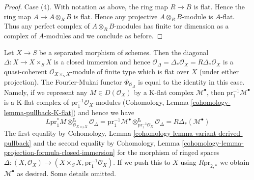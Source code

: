 \begin{proof}
\medskip\noindent
Case (4). With notation as above, the ring map $R \to B$ is flat.
Hence the ring map $A \to A \otimes_R B$ is flat. Hence any projective
$A \otimes_R B$-module is $A$-flat. Thus any perfect complex of
$A \otimes_R B$-modules has finite tor dimension as a complex
of $A$-modules and we conclude as before.
\end{proof}

\begin{example}
\label{example-diagonal-fourier-mukai}
Let $X \to S$ be a separated morphism of schemes. Then the diagonal
$\Delta : X \to X \times_S X$ is a closed immersion and hence
$\mathcal{O}_\Delta = \Delta_*\mathcal{O}_X = R\Delta_*\mathcal{O}_X$
is a quasi-coherent $\mathcal{O}_{X \times_S X}$-module of finite type
which is flat over $X$ (under either projection). The Fourier-Mukai functor
$\Phi_{\mathcal{O}_\Delta}$ is equal to the identity in this case.
Namely, if we represent any $M \in D(\mathcal{O}_X)$ by a K-flat
complex $\mathcal{M}^\bullet$, then $\text{pr}_1^{-1}\mathcal{M}^\bullet$
is a K-flat complex of $\text{pr}_1^{-1}\mathcal{O}_X$-modules
(Cohomology, Lemma \ref{cohomology-lemma-pullback-K-flat})
and hence we have
$$
L\text{pr}_1^*M \otimes_{\mathcal{O}_{X \times_S X}}^\mathbf{L}
\mathcal{O}_\Delta =
\text{pr}_1^{-1}\mathcal{M}^\bullet
\otimes_{\text{pr}_1^{-1}\mathcal{O}_X}^\mathbf{L}
\mathcal{O}_\Delta =
R\Delta_*(\mathcal{M}^\bullet)
$$
The first equality by Cohomology, Lemma
\ref{cohomology-lemma-variant-derived-pullback} and
the second equality by Cohomology, Lemma
\ref{cohomology-lemma-projection-formula-closed-immersion}
for the morphism of ringed spaces $\Delta : (X, \mathcal{O}_X) \to
(X \times_S X, \text{pr}_1^{-1}\mathcal{O}_X)$.
If we push this to $X$ using $R\text{pr}_{2, *}$
we obtain $\mathcal{M}^\bullet$ as desired. Some details omitted.
\end{example}

